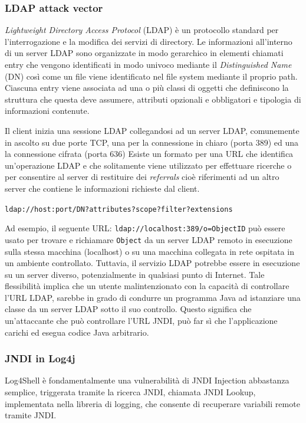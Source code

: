 \documentclass[a4paper, 12pt]{article}
\begin{document}
\subsubsection{LDAP attack vector}
\emph{Lightweight Directory Access Protocol} (LDAP) è un protocollo standard per l'interrogazione e la modifica dei servizi di directory.
Le informazioni all’interno di un server LDAP sono organizzate in modo gerarchico in elementi chiamati entry che vengono identificati in modo univoco mediante il \emph{Distinguished Name} (DN) così come un file viene identificato nel file system mediante il proprio path. Ciascuna entry viene associata ad una o più classi di oggetti che definiscono la struttura che questa deve assumere, attributi opzionali e obbligatori e tipologia di informazioni contenute.

Il client inizia una sessione LDAP collegandosi ad un server LDAP, comunemente in ascolto su due porte TCP, una per la connessione in chiaro (porta 389) ed una la connessione cifrata (porta 636)
Esiste un formato per una URL che identifica un'operazione LDAP e che solitamente viene utilizzato per effettuare ricerche o per consentire al server di restituire dei \emph{referrals} cioè riferimenti ad un altro server che contiene le informazioni richieste dal client.
\begin{center}
    \verb!ldap://host:port/DN?attributes?scope?filter?extensions!
\end{center}

Ad esempio, il seguente URL: \verb!ldap://localhost:389/o=ObjectID! può essere usato per trovare e richiamare \verb!Object! da un server LDAP remoto in esecuzione sulla stessa macchina (localhost) o su una macchina collegata in rete ospitata in un ambiente controllato.
Tuttavia, il servizio LDAP potrebbe essere in esecuzione su un server diverso, potenzialmente in qualsiasi punto di Internet. Tale flessibilità implica che un utente malintenzionato con la capacità di controllare l'URL LDAP, sarebbe in grado di condurre un programma Java ad istanziare una classe da un server LDAP sotto il suo controllo. 
Questo significa che un'attaccante che può controllare l'URL JNDI, può far sì che l'applicazione carichi ed esegua codice Java arbitrario.


\subsubsection{JNDI in Log4j}
Log4Shell è fondamentalmente una vulnerabilità di JNDI Injection abbastanza semplice, triggerata tramite la ricerca JNDI, chiamata JNDI Lookup, implementata nella libreria di logging, che consente di recuperare variabili remote tramite JNDI.
\end{document}
